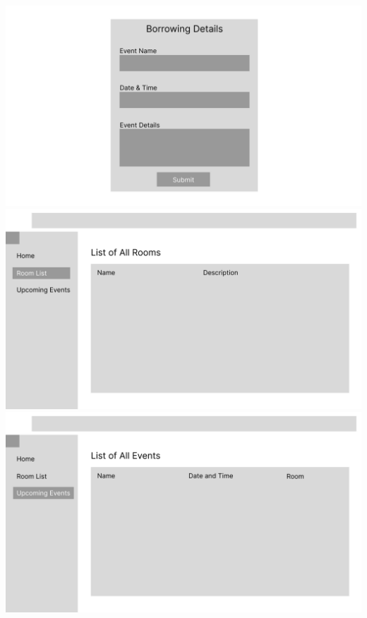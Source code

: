 \documentclass[12pt,titlepage,a4paper]{report}
\begin{document}
\begin{center}
        \includegraphics[width=\textwidth]{images/figures/UIUX/Borrowing_Details_Page_(User).png}\\
        \includegraphics[width=\textwidth]{images/figures/UIUX/Room_List_Page_(User).png}\\
        \includegraphics[width=\textwidth]{images/figures/UIUX/Event_List_Page_(User).png}\\
    \end{center}
\end{document}
